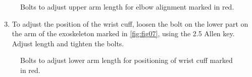 \begin{figure}[H]
	\centering
	\begin{center}
	\end{center}
	\caption{Bolts to adjust upper arm length for elbow alignment marked in red.}
	\label{fig:fig06}
\end{figure}



\begin{enumerate}[]
	\setcounter{enumi}{2}
	\item To adjust the position of the wrist cuff, loosen the bolt on the lower part on the arm of the exoskeleton marked in \autoref{fig:fig07}, using the 2.5 Allen key. Adjust length and tighten the bolts.
\end{enumerate} 

\begin{figure}[H]
	\centering
	\begin{center}
	\end{center}
	\caption{Bolts to adjust lower arm length for positioning of wrist cuff marked in red.}
	\label{fig:fig07}
\end{figure}
